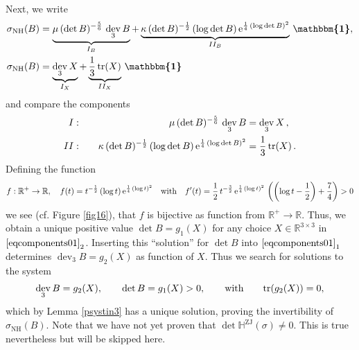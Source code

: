 \documentclass[10pt]{article}
\numberwithin{theoremCounter}{section}
\theoremstyle{plain}
\theoremstyle{definition}
\newcommand{\id}{{\boldsymbol{\mathbbm{1}}}}
\newcommand{\R}{\mathbb{R}}
\DeclareMathOperator{\dev}{dev}
\DeclareMathOperator{\tr}{tr}
\DeclareMathOperator{\ZJ}{ZJ}
\DeclareMathOperator{\NH}{NH}
\def\tr{\textnormal{tr}}
\def\H{\mathbb{H}}
\numberwithin{equation}{section}
\begin{document}
\begin{appendix}
\begin{figure}[h!]
\begin{center}
\begin{minipage}[h!]{0.95\linewidth}
\label{fig10}
\end{minipage}
\end{center}
\end{figure}
%
\noindent Next, we write
	\begin{equation}
	\begin{alignedat}{2}
	\sigma_{\NH}(B) &= \underbrace{\mu \, (\det B)^{-\frac56} \, \dev_3 B}_{I_B} + \underbrace{\kappa \, (\det B)^{-\frac12} \, (\log \det B) \, \mathrm{e}^{\frac14 \, (\log \det B)^2}}_{II_B}  \, \id ,\\
	\sigma_{\NH}(B) &= \underbrace{\dev_3 X}_{I_X} + \underbrace{\frac13 \, \tr(X)}_{II_X} \, \id
	\end{alignedat}
	\end{equation}
and compare the components
	\begin{equation}
	\label{eqcomponents01}
	\begin{alignedat}{3}
	I: &&\qquad \mu \, (\det B)^{-\frac56} \, \dev_3 B &= \dev_3 X \, ,\\
	II: &&\qquad \kappa \, (\det B)^{-\frac12} \, (\log \det B) \, \mathrm{e}^{\frac14 \, (\log \det B)^2} &= \frac13 \, \tr(X) \, .
	\end{alignedat}
	\end{equation}
Defining the function
	\begin{align}
	f: \R^+ \to \R, \quad f(t) = t^{-\frac12} \, (\log t) \, \mathrm{e}^{\frac14 \, (\log t)^2} \quad \textnormal{with} \quad f'(t) = \frac12 \, t^{-\frac32} \, \mathrm{e}^{\frac14 \, (\log t)^2} \, \left(\left(\log t - \frac12 \right) + \frac74 \right) > 0
	\end{align}
we see (cf. Figure \ref{fig16}), that $f$ is bijective as function from $\R^+ \to \R$. Thus, we obtain a unique positive value $\det B = g_1(X)$ for any choice $X \in \R^{3 \times 3}$ in $\eqref{eqcomponents01}_2$. Inserting this ``solution'' for $\det B$ into $\eqref{eqcomponents01}_1$ determines $\dev_3 B = g_2(X)$ as function of $X$. Thus we search for solutions to the system
	\begin{align}
	\dev_3 B = g_2(X), \qquad \det B = g_1(X) > 0, \qquad \textnormal{with} \qquad \tr(g_2(X)) = 0,
	\end{align}
which by Lemma \ref{psystin3} has a unique solution, proving the invertibility of $\sigma_{\NH}(B)$. Note that we have not yet proven that $\det \H^{\ZJ}(\sigma) \neq 0$. This is true nevertheless but will be skipped here. \\
	\begin{figure}[h!]
		\begin{center}

\end{center}
\end{figure}
\end{appendix}
\end{document}
